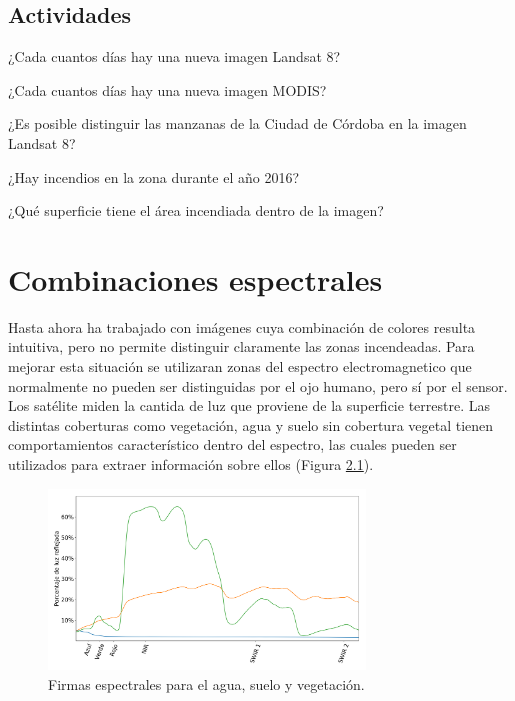\documentclass[a4paper,12pt]{book}
\begin{document}
\section{Actividades}
\begin{que}
    ¿Cada cuantos días hay una nueva imagen Landsat 8?
\end{que}
\begin{que}
    ¿Cada cuantos días hay una nueva imagen MODIS?
\end{que}
\begin{que}
    ¿Es posible distinguir las manzanas de la Ciudad de Córdoba en la imagen Landsat 8?
\end{que}
\begin{que}
    ¿Hay incendios en la zona durante el año 2016?
\end{que}
\begin{que}
    ¿Qué superficie tiene el área incendiada dentro de la imagen?
\end{que}

\chapter{Combinaciones espectrales}

Hasta ahora ha trabajado con imágenes cuya combinación de colores resulta intuitiva, pero no permite distinguir claramente las zonas incendeadas. Para mejorar esta situación se utilizaran zonas del espectro electromagnetico que normalmente no pueden ser distinguidas por el ojo humano, pero sí por el sensor.
Los satélite miden la cantida de luz que proviene de la superficie terrestre. Las distintas coberturas como vegetación, agua y suelo sin cobertura vegetal tienen comportamientos característico dentro del espectro, las cuales pueden ser utilizados para extraer información sobre ellos (Figura \ref{fig:spec}).



\begin{figure}[h!]
    \centering
    \includegraphics[width=0.75\textwidth]{fig:spec.png}
    \caption{Firmas espectrales para el agua, suelo y vegetación.}
    \label{fig:spec}
\end{figure}
\end{document}
